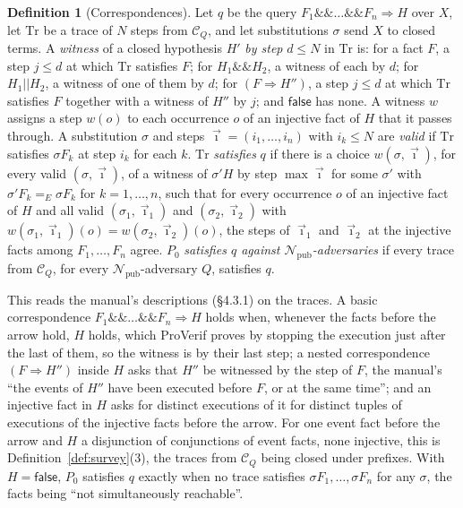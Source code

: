 \documentclass[11pt]{article}
\theoremstyle{definition}
\newtheorem{definition}{Definition}[section]
\theoremstyle{plain}
\theoremstyle{remark}
\begin{document}
\begin{definition}[Correspondences]\label{def:corr-facts}
Let $q$ be the query $F_1\mathbin{\&\&}\dots\mathbin{\&\&}F_n\Longrightarrow H$ over $X$, let $\mathrm{Tr}$ be a trace of $N$ steps from $\mathcal{C}_Q$, and let substitutions $\sigma$ send $X$ to closed terms. A \emph{witness} of a closed hypothesis $H'$ \emph{by step} $d\le N$ in $\mathrm{Tr}$ is: for a fact $F$, a step $j\le d$ at which $\mathrm{Tr}$ satisfies $F$; for $H_1\mathbin{\&\&}H_2$, a witness of each by $d$; for $H_1\mathbin{||}H_2$, a witness of one of them by $d$; for $(F\Longrightarrow H'')$, a step $j\le d$ at which $\mathrm{Tr}$ satisfies $F$ together with a witness of $H''$ by $j$; and $\mathsf{false}$ has none. A witness $w$ assigns a step $w(o)$ to each occurrence $o$ of an injective fact of $H$ that it passes through. A substitution $\sigma$ and steps $\vec\imath=(i_1,\dots,i_n)$ with $i_k\le N$ are \emph{valid} if $\mathrm{Tr}$ satisfies $\sigma F_k$ at step $i_k$ for each $k$. $\mathrm{Tr}$ \emph{satisfies} $q$ if there is a choice $w(\sigma,\vec\imath)$, for every valid $(\sigma,\vec\imath)$, of a witness of $\sigma'H$ by step $\max\vec\imath$ for some $\sigma'$ with $\sigma'F_k=_E\sigma F_k$ for $k=1,\dots,n$, such that for every occurrence $o$ of an injective fact of $H$ and all valid $(\sigma_1,\vec\imath_1)$ and $(\sigma_2,\vec\imath_2)$ with $w(\sigma_1,\vec\imath_1)(o)=w(\sigma_2,\vec\imath_2)(o)$, the steps of $\vec\imath_1$ and $\vec\imath_2$ at the injective facts among $F_1,\dots,F_n$ agree. $P_0$ \emph{satisfies $q$ against $\mathcal{N}_{\mathrm{pub}}$-adversaries} if every trace from $\mathcal{C}_Q$, for every $\mathcal{N}_{\mathrm{pub}}$-adversary $Q$, satisfies $q$.

This reads the manual's descriptions (\S4.3.1) on the traces. A basic correspondence $F_1\mathbin{\&\&}\dots\mathbin{\&\&}F_n\Longrightarrow H$ holds when, whenever the facts before the arrow hold, $H$ holds, which ProVerif proves by stopping the execution just after the last of them, so the witness is by their last step; a nested correspondence $(F\Longrightarrow H'')$ inside $H$ asks that $H''$ be witnessed by the step of $F$, the manual's ``the events of $H''$ have been executed before $F$, or at the same time''; and an injective fact in $H$ asks for distinct executions of it for distinct tuples of executions of the injective facts before the arrow. For one event fact before the arrow and $H$ a disjunction of conjunctions of event facts, none injective, this is Definition~\ref{def:survey}(3), the traces from $\mathcal{C}_Q$ being closed under prefixes. With $H=\mathsf{false}$, $P_0$ satisfies $q$ exactly when no trace satisfies $\sigma F_1,\dots,\sigma F_n$ for any $\sigma$, the facts being ``not simultaneously reachable''.
\end{definition}
\end{document}
